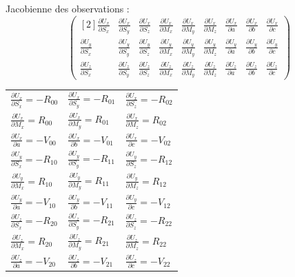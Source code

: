 \documentclass[french]{report}
\begin{document}
\vspace{0.3cm}
Jacobienne des observations :
$$\begin{pmatrix}[2]
\frac{\partial{U_x}}{\partial{S_x}} & \frac{\partial{U_x}}{\partial{S_y}} & \frac{\partial{U_x}}{\partial{S_z}} & \frac{\partial{U_x}}{\partial{M_x}} & \frac{\partial{U_x}}{\partial{M_y}} & \frac{\partial{U_x}}{\partial{M_z}} & \frac{\partial{U_x}}{\partial{a}} & \frac{\partial{U_x}}{\partial{b}} & \frac{\partial{U_x}}{\partial{c}} \\
\frac{\partial{U_y}}{\partial{S_x}} & \frac{\partial{U_y}}{\partial{S_y}} & \frac{\partial{U_y}}{\partial{S_z}} & \frac{\partial{U_y}}{\partial{M_x}} & \frac{\partial{U_y}}{\partial{M_y}} & \frac{\partial{U_y}}{\partial{M_z}} & \frac{\partial{U_y}}{\partial{a}} & \frac{\partial{U_y}}{\partial{b}} & \frac{\partial{U_y}}{\partial{c}} \\
\frac{\partial{U_z}}{\partial{S_x}} & \frac{\partial{U_z}}{\partial{S_y}} & \frac{\partial{U_z}}{\partial{S_z}} & \frac{\partial{U_z}}{\partial{M_x}} & \frac{\partial{U_z}}{\partial{M_y}} & \frac{\partial{U_z}}{\partial{M_z}} & \frac{\partial{U_z}}{\partial{a}} & \frac{\partial{U_z}}{\partial{b}} & \frac{\partial{U_z}}{\partial{c}}
\end{pmatrix}$$

\vspace{0.3cm}
\begin{tabular}{lll}
$\frac{\partial{U_x}}{\partial{S_x}} = -R_{00}$ & $\frac{\partial{U_x}}{\partial{S_y}} = -R_{01}$ & $\frac{\partial{U_x}}{\partial{S_z}} = -R_{02}$ \\[0.3cm]
$\frac{\partial{U_x}}{\partial{M_x}} = R_{00}$ & $\frac{\partial{U_x}}{\partial{M_y}} = R_{01}$ & $\frac{\partial{U_x}}{\partial{M_z}} = R_{02}$ \\[0.3cm]
$\frac{\partial{U_x}}{\partial{a}} = -V_{00}$ & $\frac{\partial{U_x}}{\partial{b}} = - V_{01}$ & $\frac{\partial{U_x}}{\partial{c}} = -V_{02}$ \\[0.3cm]
$\frac{\partial{U_y}}{\partial{S_x}} = -R_{10}$ & $\frac{\partial{U_y}}{\partial{S_y}} = -R_{11}$ & $\frac{\partial{U_y}}{\partial{S_z}} = -R_{12}$ \\[0.3cm]
$\frac{\partial{U_y}}{\partial{M_x}} = R_{10}$ & $\frac{\partial{U_y}}{\partial{M_y}} = R_{11}$ & $\frac{\partial{U_y}}{\partial{M_z}} = R_{12}$ \\[0.3cm]
$\frac{\partial{U_y}}{\partial{a}} = -V_{10}$ & $\frac{\partial{U_y}}{\partial{b}} = - V_{11}$ & $\frac{\partial{U_y}}{\partial{c}} = -V_{12}$ \\[0.3cm]
$\frac{\partial{U_z}}{\partial{S_x}} = -R_{20}$ & $\frac{\partial{U_z}}{\partial{S_y}} = -R_{21}$ & $\frac{\partial{U_z}}{\partial{S_z}} = -R_{22}$ \\[0.3cm]
$\frac{\partial{U_z}}{\partial{M_x}} = R_{20}$ & $\frac{\partial{U_z}}{\partial{M_y}} = R_{21}$ & $\frac{\partial{U_z}}{\partial{M_z}} = R_{22}$ \\[0.3cm]
$\frac{\partial{U_z}}{\partial{a}} = -V_{20}$ & $\frac{\partial{U_z}}{\partial{b}} = - V_{21}$ & $\frac{\partial{U_z}}{\partial{c}} = -V_{22}$
\end{tabular}
\end{document}
